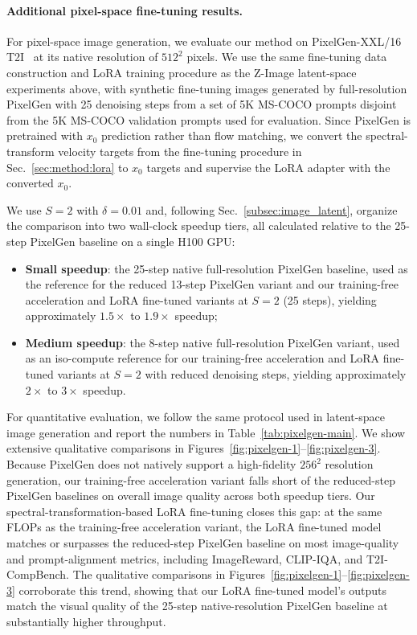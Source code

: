 \paragraph{Additional pixel-space fine-tuning results.} For pixel-space image generation, we evaluate our method on PixelGen-XXL/16 T2I~\citep{pixelgen} at its native resolution of $512^2$ pixels. We use the same fine-tuning data construction and LoRA training procedure as the Z-Image latent-space experiments above, with synthetic fine-tuning images generated by full-resolution PixelGen with 25 denoising steps from a set of 5K MS-COCO prompts disjoint from the 5K MS-COCO validation prompts used for evaluation. Since PixelGen is pretrained with $x_0$ prediction rather than flow matching, we convert the spectral-transform velocity targets from the fine-tuning procedure in Sec.~\ref{sec:method:lora} to $x_0$ targets and supervise the LoRA adapter with the converted $x_0$.

We use $S=2$ with $\delta=0.01$ and, following Sec.~\ref{subsec:image_latent}, organize the comparison into two wall-clock speedup tiers, all calculated relative to the 25-step PixelGen baseline on a single H100 GPU:

\begin{itemize}
    \item \textbf{Small speedup}: the 25-step native full-resolution PixelGen baseline, used as the reference for the reduced 13-step PixelGen variant and our training-free acceleration and LoRA fine-tuned variants at $S=2$ (25 steps), yielding approximately $1.5\times$ to $1.9\times$ speedup;
    \item \textbf{Medium speedup}: the 8-step native full-resolution PixelGen variant, used as an iso-compute reference for our training-free acceleration and LoRA fine-tuned variants at $S=2$ with reduced denoising steps, yielding approximately $2\times$ to $3\times$ speedup.
\end{itemize}

For quantitative evaluation, we follow the same protocol used in latent-space image generation and report the numbers in Table~\ref{tab:pixelgen-main}. We show extensive qualitative comparisons in Figures~\ref{fig:pixelgen-1}--\ref{fig:pixelgen-3}. Because PixelGen does not natively support a high-fidelity $256^2$ resolution generation, our training-free acceleration variant falls short of the reduced-step PixelGen baselines on overall image quality across both speedup tiers. Our spectral-transformation-based LoRA fine-tuning closes this gap: at the same FLOPs as the training-free acceleration variant, the LoRA fine-tuned model matches or surpasses the reduced-step PixelGen baseline on most image-quality and prompt-alignment metrics, including ImageReward, CLIP-IQA, and T2I-CompBench. The qualitative comparisons in Figures~\ref{fig:pixelgen-1}--\ref{fig:pixelgen-3} corroborate this trend, showing that our LoRA fine-tuned model's outputs match the visual quality of the 25-step native-resolution PixelGen baseline at substantially higher throughput.

